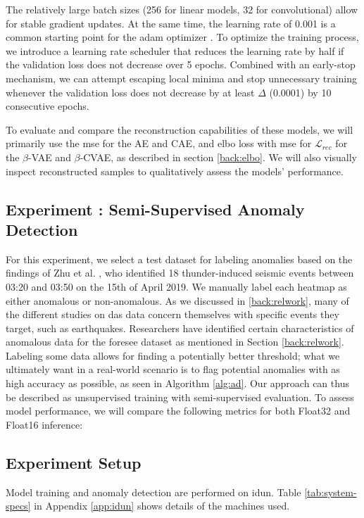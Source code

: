  The relatively large batch sizes (256 for linear models, 32 for convolutional) allow for stable gradient updates. At the same time, the learning rate of 0.001 is a common starting point for the \acrshort{adam} optimizer \cite{kingma2017adam}. To optimize the training process, we introduce a learning rate scheduler that reduces the learning rate by half if the validation loss does not decrease over 5 epochs. Combined with an early-stop mechanism, we can attempt escaping local minima and stop unnecessary training whenever the validation loss does not decrease by at least $\Delta$ (0.0001) by 10 consecutive epochs.  

To evaluate and compare the reconstruction capabilities of these models, we will primarily use the \acrshort{mse} for the AE and CAE, and  \acrshort{elbo} loss with \acrshort{mse} for $\mathcal{L}_{rec}$ for the $\beta$-VAE and $\beta$-CVAE, as described in section \ref{back:elbo}. We will also visually inspect reconstructed samples to qualitatively assess the models' performance.



\subsection{Experiment : Semi-Supervised Anomaly Detection}

For this experiment, we select a test dataset for labeling anomalies based on the findings of Zhu et al. \cite{zhu2023seismic}, who identified 18 thunder-induced seismic events between 03:20 and 03:50 on the 15th of April 2019. We manually label each heatmap as either anomalous or non-anomalous. As we discussed in \ref{back:relwork}, many of the different studies on \acrshort{das} data concern themselves with specific events they target, such as earthquakes. Researchers have identified certain characteristics of anomalous data for the \acrshort{foresee} dataset as mentioned in Section \ref{back:relwork}. Labeling some data allows for finding a potentially better threshold; what we ultimately want in a real-world scenario is to flag potential anomalies with as high accuracy as possible, as seen in Algorithm \ref{alg:ad}. Our approach can thus be described as unsupervised training with semi-supervised evaluation. To assess model performance, we will compare the following metrics for both Float32 and Float16 inference:

\subsection{Experiment Setup}

Model training and anomaly detection are performed on \gls{idun}. Table \ref{tab:system-specs} in Appendix \ref{app:idun} shows details of the machines used. \\

